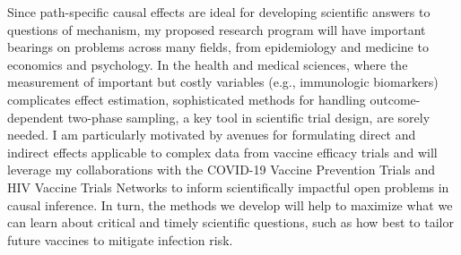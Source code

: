 Since path-specific causal effects are ideal for developing scientific answers
to questions of mechanism, my proposed research program will have important
bearings on problems across many fields, from epidemiology and medicine to
economics and psychology. In the health and medical sciences, where the
measurement of important but costly variables (e.g., immunologic biomarkers)
complicates effect estimation, sophisticated methods for handling
outcome-dependent two-phase sampling, a key tool in scientific trial design, are
sorely needed. I am particularly motivated by avenues for formulating direct and
indirect effects applicable to complex data from vaccine efficacy trials and
will leverage my collaborations with the COVID-19 Vaccine Prevention Trials and
HIV Vaccine Trials Networks to inform scientifically impactful open problems in
causal inference. In turn, the methods we develop will help to maximize what we
can learn about critical and timely scientific questions, such as how best to
tailor future vaccines to mitigate infection risk.
